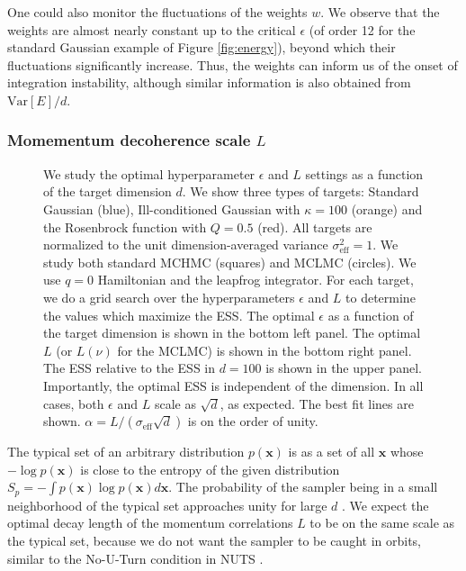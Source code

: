 \documentclass[twoside,11pt]{article}
\newcommand{\x}{\boldsymbol{x}}
\begin{document}
One could also monitor the fluctuations of the weights $w$. We observe that the weights are almost nearly 
constant up to the critical $\epsilon$ (of order 12 for the standard Gaussian example of Figure \ref{fig:energy}), beyond which their fluctuations significantly increase. Thus, the weights can inform us of the onset of integration instability, although similar information is also obtained from $\mathrm{Var}[E]/d$. 


\subsubsection{Momementum decoherence scale $L$}


\begin{figure}
    \caption{We study the optimal hyperparameter $\epsilon$ and $L$ settings as a function of the target dimension $d$. We show three types of targets: Standard Gaussian (blue), Ill-conditioned Gaussian with $\kappa = 100$ (orange) and the Rosenbrock function with $Q = 0.5$ (red). All targets are normalized to the unit dimension-averaged variance $\sigma^2_{\text{eff}} = 1$. We study both standard MCHMC (squares) and MCLMC (circles). We use $q = 0$ Hamiltonian and the leapfrog integrator.
    For each target, we do a grid search over the hyperparameters $\epsilon$ and $L$ to determine the values which maximize the ESS. The optimal $\epsilon$ as a function of the target dimension is shown in the bottom left panel. The optimal $L$ (or $L(\nu)$ for the MCLMC) is shown in the bottom right panel. The ESS relative to the ESS in $d = 100$ is shown in the upper panel. Importantly, the optimal ESS is independent of the dimension. In all cases, both $\epsilon$ and $L$ scale as $\sqrt{d}$, as expected. The best fit lines are shown. $\alpha = L / (\sigma_{\text{eff}} \sqrt{d})$ is on the order of unity.
    }
    \label{fig: scaling}
\end{figure}


The typical set of an arbitrary distribution $p(\x)$ is as a set of all $\x$ whose $-\log p(\x)$ is close to the entropy of the given distribution $S_p = - \int p(\x) \log p(\x) d \x $. The probability of the sampler being in a small neighborhood of the typical set approaches unity for large $d$ \citep{typical_set1, typical_set2}.
We expect the optimal decay length of the momentum correlations $L$ to be on the same scale as the typical set, because we do not want the sampler to be caught in orbits, similar to the No-U-Turn condition in NUTS \citep{NUTS}.
\end{document}
